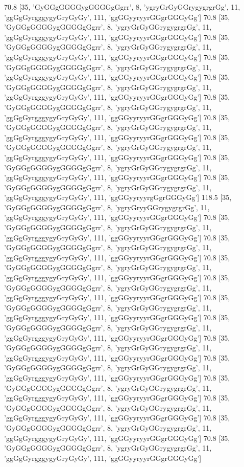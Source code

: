 70.8 [35, 'GyGGgGGGGygGGGGgGgrr', 8, 'ygryGrGyGGrygygrgrGg', 11, 'ggGgGyrgggygyGryGyGy', 111, 'ggGGyyryyrGGgrGGGyGg']
70.8 [35, 'GyGGgGGGGygGGGGgGgrr', 8, 'ygryGrGyGGrygygrgrGg', 11, 'ggGgGyrgggygyGryGyGy', 111, 'ggGGyyryyrGGgrGGGyGg']
70.8 [35, 'GyGGgGGGGygGGGGgGgrr', 8, 'ygryGrGyGGrygygrgrGg', 11, 'ggGgGyrgggygyGryGyGy', 111, 'ggGGyyryyrGGgrGGGyGg']
70.8 [35, 'GyGGgGGGGygGGGGgGgrr', 8, 'ygryGrGyGGrygygrgrGg', 11, 'ggGgGyrgggygyGryGyGy', 111, 'ggGGyyryyrGGgrGGGyGg']
70.8 [35, 'GyGGgGGGGygGGGGgGgrr', 8, 'ygryGrGyGGrygygrgrGg', 11, 'ggGgGyrgggygyGryGyGy', 111, 'ggGGyyryyrGGgrGGGyGg']
70.8 [35, 'GyGGgGGGGygGGGGgGgrr', 8, 'ygryGrGyGGrygygrgrGg', 11, 'ggGgGyrgggygyGryGyGy', 111, 'ggGGyyryyrGGgrGGGyGg']
70.8 [35, 'GyGGgGGGGygGGGGgGgrr', 8, 'ygryGrGyGGrygygrgrGg', 11, 'ggGgGyrgggygyGryGyGy', 111, 'ggGGyyryyrGGgrGGGyGg']
70.8 [35, 'GyGGgGGGGygGGGGgGgrr', 8, 'ygryGrGyGGrygygrgrGg', 11, 'ggGgGyrgggygyGryGyGy', 111, 'ggGGyyryyrGGgrGGGyGg']
70.8 [35, 'GyGGgGGGGygGGGGgGgrr', 8, 'ygryGrGyGGrygygrgrGg', 11, 'ggGgGyrgggygyGryGyGy', 111, 'ggGGyyryyrGGgrGGGyGg']
70.8 [35, 'GyGGgGGGGygGGGGgGgrr', 8, 'ygryGrGyGGrygygrgrGg', 11, 'ggGgGyrgggygyGryGyGy', 111, 'ggGGyyryyrgGgrGGGyGg']
118.5 [35, 'GyGGgGGGGygGGGGgGgrr', 8, 'ygryGryyGGrygygrgrGg', 11, 'ggGgGyrgggygyGryGyGy', 111, 'ggGGyyryyrGGgrGGGyGg']
70.8 [35, 'GyGGgGGGGygGGGGgGgrr', 8, 'ygryGrGyGGrygygrgrGg', 11, 'ggGgGyrgggygyGryGyGy', 111, 'ggGGyyryyrGGgrGGGyGg']
70.8 [35, 'GyGGgGGGGygGGGGgGgrr', 8, 'ygryGrGyGGrygygrgrGg', 11, 'ggGgGyrgggygyGryGyGy', 111, 'ggGGyyryyrGGgrGGGyGg']
70.8 [35, 'GyGGgGGGGygGGGGgGgrr', 8, 'ygryGrGyGGrygygrgrGg', 11, 'ggGgGyrgggygyGryGyGy', 111, 'ggGGyyryyrGGgrGGGyGg']
70.8 [35, 'GyGGgGGGGygGGGGgGgrr', 8, 'ygryGrGyGGrygygrgrGg', 11, 'ggGgGyrgggygyGryGyGy', 111, 'ggGGyyryyrGGgrGGGyGg']
70.8 [35, 'GyGGgGGGGygGGGGgGgrr', 8, 'ygryGrGyGGrygygrgrGg', 11, 'ggGgGyrgggygyGryGyGy', 111, 'ggGGyyryyrGGgrGGGyGg']
70.8 [35, 'GyGGgGGGGygGGGGgGgrr', 8, 'ygryGrGyGGrygygrgrGg', 11, 'ggGgGyrgggygyGryGyGy', 111, 'ggGGyyryyrGGgrGGGyGg']
70.8 [35, 'GyGGgGGGGygGGGGgGgrr', 8, 'ygryGrGyGGrygygrgrGg', 11, 'ggGgGyrgggygyGryGyGy', 111, 'ggGGyyryyrGGgrGGGyGg']
70.8 [35, 'GyGGgGGGGygGGGGgGgrr', 8, 'ygryGrGyGGrygygrgrGg', 11, 'ggGgGyrgggygyGryGyGy', 111, 'ggGGyyryyrGGgrGGGyGg']
70.8 [35, 'GyGGgGGGGygGGGGgGgrr', 8, 'ygryGrGyGGrygygrgrGg', 11, 'ggGgGyrgggygyGryGyGy', 111, 'ggGGyyryyrGGgrGGGyGg']
70.8 [35, 'GyGGgGGGGygGGGGgGgrr', 8, 'ygryGrGyGGrygygrgrGg', 11, 'ggGgGyrgggygyGryGyGy', 111, 'ggGGyyryyrGGgrGGGyGg']
70.8 [35, 'GyGGgGGGGygGGGGgGgrr', 8, 'ygryGrGyGGrygygrgrGg', 11, 'ggGgGyrgggygyGryGyGy', 111, 'ggGGyyryyrGGgrGGGyGg']
70.8 [35, 'GyGGgGGGGygGGGGgGgrr', 8, 'ygryGrGyGGrygygrgrGg', 11, 'ggGgGyrgggygyGryGyGy', 111, 'ggGGyyryyrGGgrGGGyGg']
